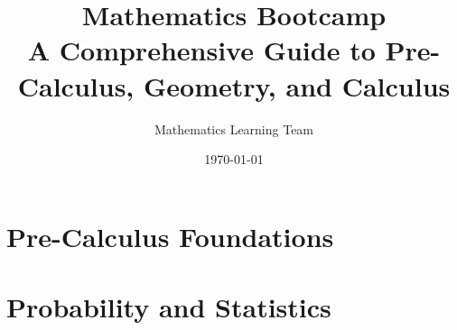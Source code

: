 \documentclass{book}
\title{Mathematics Bootcamp\\
       \large A Comprehensive Guide to Pre-Calculus, Geometry, and Calculus}
\author{Mathematics Learning Team}
\date{\today}
\begin{document}
\maketitle
\tableofcontents

\part{Pre-Calculus Foundations}

% 
% 
% 
% 
% 
% 
% 
% 


% 
% 
% 


% 


\part{Probability and Statistics}

% 


% 
\end{document}
